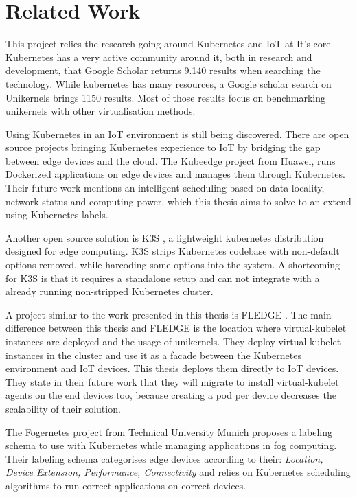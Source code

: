 
\chapter{Related Work}\label{chapter:literature}

This project relies the research going around Kubernetes and IoT at It's core. Kubernetes has a very active community around it, both in research and development, that Google Scholar returns 9.140 results when searching the technology. While kubernetes has many resources, a Google scholar search on Unikernels brings 1150 results. Most of those results focus on benchmarking unikernels with other virtualisation methods.

Using Kubernetes in an IoT environment is still being discovered. There are open source projects bringing Kubernetes experience to IoT by bridging the gap between edge devices and the cloud. The Kubeedge project \cite{kubeedge} from Huawei, runs Dockerized applications on edge devices and manages them through Kubernetes. Their future work mentions an intelligent scheduling based on data locality, network status and computing power, which this thesis aims to solve to an extend using Kubernetes labels.

Another open source solution is K3S \cite{k3s}, a lightweight kubernetes distribution designed for edge computing. K3S strips Kubernetes codebase with non-default options removed, while harcoding some options into the system. A shortcoming for K3S is that it requires a standalone setup and can not integrate with a already running non-stripped Kubernetes cluster.

A project similar to the work presented in this thesis is FLEDGE \cite{fledge}. The main difference between this thesis and FLEDGE is the location where virtual-kubelet instances are deployed and the usage of unikernels. They deploy virtual-kubelet instances in the cluster and use it as a facade between the Kubernetes environment and IoT devices. This thesis deploys them directly to IoT devices. They state in their future work that they will migrate to install virtual-kubelet agents on the end devices too, because creating a pod per device decreases the scalability of their solution.

The Fogernetes project \cite{fogernetes} from Technical University Munich proposes a labeling schema to use with Kubernetes while managing applications in fog computing. Their labeling schema categorises edge devices according to their: \textit{Location, Device Extension, Performance, Connectivity} and relies on Kubernetes scheduling algorithms to run correct applications on correct devices.


